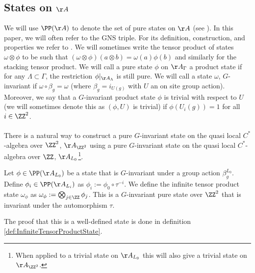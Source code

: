 \subsection{States on \texorpdfstring{$\AA$}{}}\label{sec:States}
We will use $\PP(\AA)$ to denote the set of pure states on $\AA$ (see \cite{bratteli1979operator}). In this paper, we will often refer to the GNS triple. For its definition, construction, and properties we refer to \cite{bratteli1979operator}. We will sometimes write the tensor product of states $\omega\otimes\phi$ to be such that $(\omega\otimes\phi)(a\otimes b)=\omega(a)\phi(b)$ and similarly for the stacking tensor product. We will call a pure state $\phi$ on $\AA_\Gamma$ a product state if for any $\Lambda\subset\Gamma$, the restriction $\phi|_{\AA_\Lambda}$ is still pure. We will call a state $\omega$, $G$-invariant if $\omega\circ\beta_g=\omega$ (where $\beta_g=i_{U(g)}$ with $U$ an on site group action). Moreover, we say that a $G$-invariant product state $\phi$ is trivial with respect to $U$ (we will sometimes denote this as $(\phi,U)$ is trivial) if $\phi(U_i(g))=1$ for all $i\in\ZZ^2$.\\\\
There is a natural way to construct a pure $G$-invariant state on the quasi local $C^*$-algebra over $\ZZ^2$, $\AA_{\ZZ^2}$ using a pure $G$-invariant state on the quasi local $C^*$-algebra over $\ZZ$, $\AA_{L_0}$\footnote{When applied to a trivial state on $\AA_{L_0}$ this will also give a trivial state on $\AA_{\ZZ^2}$.}.
\begin{definition}\label{def:InfiniteTensorProduct}
	Let $\phi\in\PP(\AA_{L_0})$ be a state that is $G$-invariant under a group action $\beta_g^{L_0}$. Define $\phi_i\in\PP(\AA_{L_i})$ as $\phi_i:=\phi_0\circ\tau^{-i}$. We define the infinite tensor product state $\omega_\phi$ as $\omega_\phi:=\bigotimes_{j\in\ZZ}\phi_j$. This is a $G$-invariant pure state over $\ZZ^2$ that is invariant under the automorphism $\tau$.
\end{definition}
The proof that this is a well-defined state is done in definition \ref{def:InfiniteTensorProductState}.
